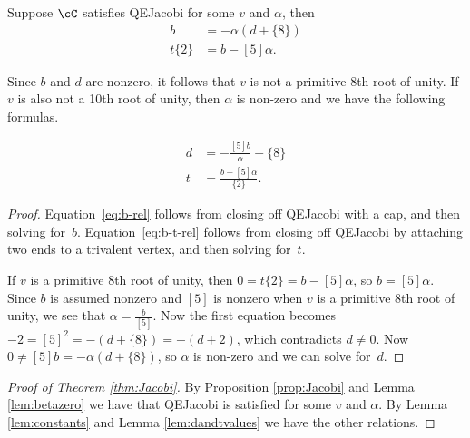 \documentclass[12pt]{amsart}
\begin{document}
\begin{lemma} \label{lem:dandtvalues}
Suppose $\cC$ satisfies QEJacobi for some $v$ and $\alpha$, then 
\begin{align}
  [5] b &= - \alpha (d+\{8\})\label{eq:b-rel} \\
  t \{2\} &= b-[5] \alpha.\label{eq:b-t-rel}
\end{align}

Since $b$ and $d$ are nonzero, it follows that $v$ is not a primitive $8$th root of unity.  If $v$ is also not a 10th root of unity, then $\alpha$ is non-zero and we have the following formulas.

\begin{align*}
  d &= -\frac{[5] b}{\alpha} - \{8\}   \\
  t  &= \frac{b-[5] \alpha}{\{2\}}.
\end{align*}
\end{lemma}
\begin{proof}
 Equation~\eqref{eq:b-rel} follows
  from closing off QEJacobi with a cap, and
  then solving for~$b$. Equation~\eqref{eq:b-t-rel} follows from
  closing off QEJacobi by attaching two ends
  to a trivalent vertex, and then solving for~$t$.
  
  If $v$ is a primitive $8$th root of unity, then $0 = t \{2\} = b-[5] \alpha$, so $b = [5] \alpha$.  Since $b$ is assumed nonzero and $[5]$ is nonzero when $v$ is a primitive $8$th root of unity, we see that $\alpha = \frac{b}{[5]}$.  Now the first equation becomes $-2 = [5]^2 = -(d+\{8\})=-(d+2)$, which contradicts $d \neq 0$.  
  Now $0 \neq [5] b = - \alpha (d+\{8\})$, so $\alpha$ is non-zero and
  we can solve for~$d$.
\end{proof}

\begin{proof}[Proof of Theorem \ref{thm:Jacobi}]
By Proposition \ref{prop:Jacobi} and Lemma \ref{lem:betazero} we have that QEJacobi is satisfied for some $v$ and $\alpha$.  By Lemma \ref{lem:constants} and Lemma \ref{lem:dandtvalues} we have the other relations.
\end{proof}
\end{document}
